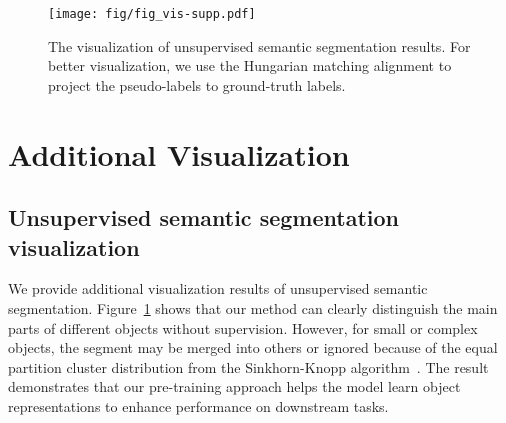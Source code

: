\documentclass{article}
\begin{document}
\begin{figure}[h!]
  \centering
  \vspace{-0.4cm}
  \texttt{[image: fig/fig\_vis-supp.pdf]}
  \vspace{-0.3cm}
  \caption{The visualization of unsupervised semantic segmentation results. For better visualization, we use the Hungarian matching alignment to project the pseudo-labels to ground-truth labels.}
\label{fig:vis-supp}
\end{figure} \section{Additional Visualization}\label{app:impl_detail}
\subsection{Unsupervised semantic segmentation visualization}
We provide additional visualization results of unsupervised semantic segmentation. Figure~\ref{fig:vis-supp} shows that our method can clearly distinguish the main parts of different objects without supervision. However, for small or complex objects, the segment may be merged into others or ignored because of the equal partition cluster distribution from the Sinkhorn-Knopp algorithm~\cite{Sinkhorn}. The result demonstrates that our pre-training approach helps the model learn object representations to enhance performance on downstream tasks. 
\end{document}
